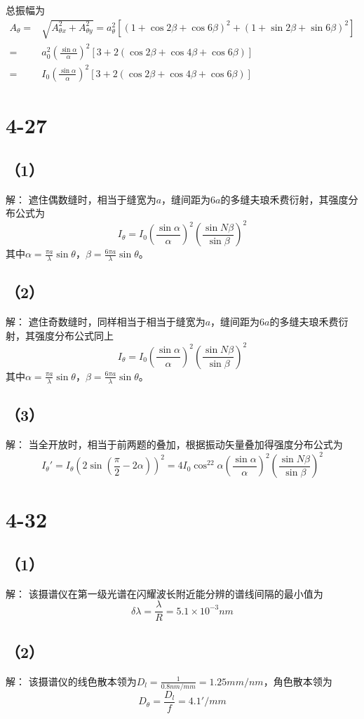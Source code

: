 \documentclass[10pt,a4paper]{article}
\begin{document}
\noindent 总振幅为
\begin{align*}
A_{\theta}=&\sqrt{A_{\theta x}^2+A_{\theta y}^2}=a_{\theta}^2[(1+\cos2\beta+\cos6\beta)^2+(1+\sin2\beta+\sin6\beta)^2]\\
=&a_0^2(\frac{\sin\alpha}{\alpha})^2[3+2(\cos2\beta+\cos4\beta+\cos6\beta)]\\
=&I_0(\frac{\sin\alpha}{\alpha})^2[3+2(\cos2\beta+\cos4\beta+\cos6\beta)]
\end{align*}
\section*{4-27}
\subsection*{（1）}解：
遮住偶数缝时，相当于缝宽为$a$，缝间距为$6a$的多缝夫琅禾费衍射，其强度分布公式为
\[
I_{\theta}=I_0(\frac{\sin\alpha}{\alpha})^2(\frac{\sin N\beta}{\sin\beta})^2
\]
其中$\alpha=\frac{\pi a}{\lambda}\sin\theta$，$\beta=\frac{6\pi a}{\lambda}\sin\theta$。
\subsection*{（2）}解：
遮住奇数缝时，同样相当于相当于缝宽为$a$，缝间距为$6a$的多缝夫琅禾费衍射，其强度分布公式同上
\[
I_{\theta}=I_0(\frac{\sin\alpha}{\alpha})^2(\frac{\sin N\beta}{\sin\beta})^2
\]
其中$\alpha=\frac{\pi a}{\lambda}\sin\theta$，$\beta=\frac{6\pi a}{\lambda}\sin\theta$。
\subsection*{（3）}解：
当全开放时，相当于前两题的叠加，根据振动矢量叠加得强度分布公式为
\[
I_{\theta}'=I_{\theta}(2\sin(\frac{\pi}{2}-2\alpha))^2=4I_0\cos^22\alpha(\frac{\sin\alpha}{\alpha})^2(\frac{\sin N\beta}{\sin\beta})^2
\]
\section*{4-32}
\subsection*{（1）}解：
该摄谱仪在第一级光谱在闪耀波长附近能分辨的谱线间隔的最小值为
\[
\delta\lambda=\frac{\lambda}{R}=5.1\times10^{-3}nm
\]
\subsection*{（2）}解：
该摄谱仪的线色散本领为$D_l=\frac{1}{0.8nm/mm}=1.25mm/nm$，角色散本领为
\[
D_{\theta}=\frac{D_l}{f}=4.1'/mm
\]
\end{document}
